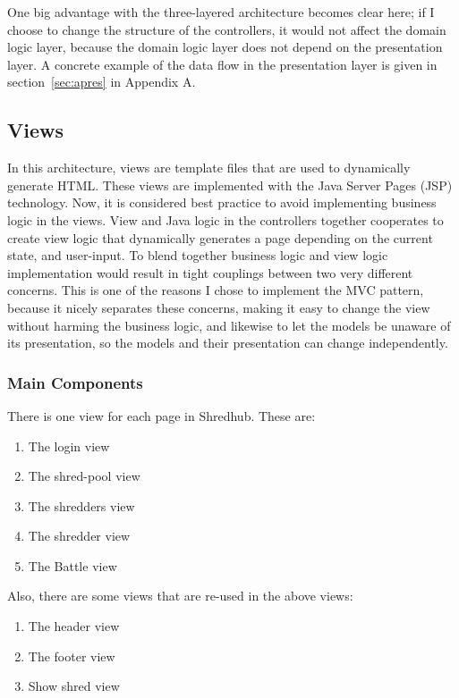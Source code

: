 One big advantage with the three-layered architecture becomes clear here; if I choose to change the structure of the controllers, it would not affect the domain logic layer, because the domain logic layer does not depend on the presentation layer. A concrete example of the data flow in the presentation layer is given in section~\ref{sec:apres} in Appendix A.

 
\subsection{Views}
In this architecture, views are template files that are used to dynamically generate HTML. These views are implemented with the Java Server Pages (JSP) technology. Now, it is considered best practice to avoid implementing business logic in the views\cite{sepbiz}. View and Java logic in the controllers together cooperates to create view logic that dynamically generates a page depending on the current state, and user-input. To blend together business logic and view logic implementation would result in tight couplings between two very different concerns. This is one of the reasons I chose to implement the MVC pattern, because it nicely separates these concerns, making it easy to change the view without harming the business logic, and likewise to let the models be unaware of its presentation, so the models and their presentation can change independently.

\subsubsection{Main Components}
There is one view for each page in Shredhub. These are:
\begin{enumerate}
\item{} The login view
\item{} The shred-pool view
\item{} The shredders view
\item{} The shredder view
\item{} The Battle view
\end{enumerate}

Also, there are some views that are re-used in the above views:
\begin{enumerate}
\item{} The header view
\item{} The footer view
\item{} Show shred view
\end{enumerate}

